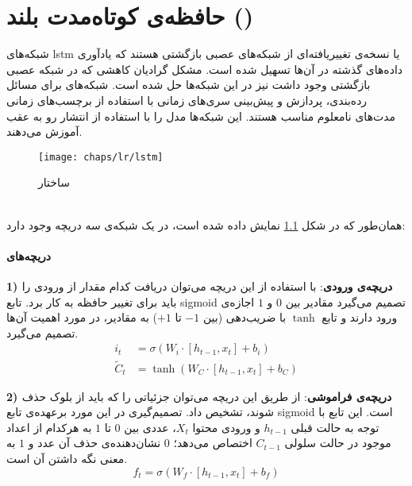 
\chapter{حافظه‌ی کوتاه‌مدت بلند ()}
\label{appex:lstm}

شبکه‌های \gls{lstm} یا  نسخه‌ی تغییریافته‌ای از شبکه‌های عصبی بازگشتی هستند که یادآوری داده‌های گذشته در آن‌ها تسهیل شده است. مشکل گرادیان کاهشی که در شبکه عصبی بازگشتی وجود داشت نیز در این شبکه‌ها حل شده است. شبکه‌های  برای مسائل رده‌بندی، پردازش و پیش‌بینی سری‌های زمانی با استفاده از برچسب‌های زمانی مدت‌های نامعلوم مناسب هستند. این شبکه‌ها مدل را با استفاده از انتشار رو به عقب آموزش می‌دهند. 
\begin{figure}[!ht]
	\centerline{\texttt{[image: chaps/lr/lstm]}}
	\caption{ساختار }
	\label{fig:ch_lr:lstm}
\end{figure}
\\
همان‌طور که در شکل \ref{fig:ch_lr:lstm} نمایش داده شده است، در یک شبکه‌ی  سه دریچه وجود دارد:

\subsubsection*{دریچه‌های }
\textbf{1) دریچه‌ی ورودی}:
با استفاده از این دریچه می‌توان دریافت کدام مقدار از ورودی را باید برای تغییر حافظه به کار برد. تابع \gls{sigmoid} تصمیم می‌گیرد مقادیر بین $0$ و $1$ اجازه‌ی ورود دارند و تابع $\tanh$ با ضریب‌دهی (بین $-1$ تا $+1$) به مقادیر، در مورد اهمیت آن‌ها تصمیم می‌گیرد.
\begin{equation}
	\begin{aligned}
		i_t &= \sigma (W_i \cdot [h_{t-1}, x_t]+b_i)
		\\
		\tilde{C}_t &= \tanh(W_C \cdot [h_{t-1}, x_t] + b_C)
	\end{aligned}
	\label{eq:ch_lr:lstm_in}
\end{equation}

\textbf{2) دریچه‌ی فراموشی}:
از طریق این دریچه می‌توان جزئیاتی را که باید از بلوک حذف شوند، تشخیص داد. تصمیم‌گیری در این مورد برعهده‌ی تابع \gls{sigmoid} است. این تابع با توجه به حالت قبلی $h_{t-1}$ و ورودی محتوا $X_t$، عددی بین $0$ تا $1$ به هرکدام از اعداد موجود در حالت سلولی $C_{t-1}$ اختصاص می‌دهد؛ $0$ نشان‌دهنده‌ی حذف آن عدد و $1$ به معنی نگه داشتن آن است.
\begin{equation}
	f_t = \sigma(W_f\cdot [h_{t-1}, x_t] + b_f)
	\label{eq:ch_lr:lstm_loss}
\end{equation}

